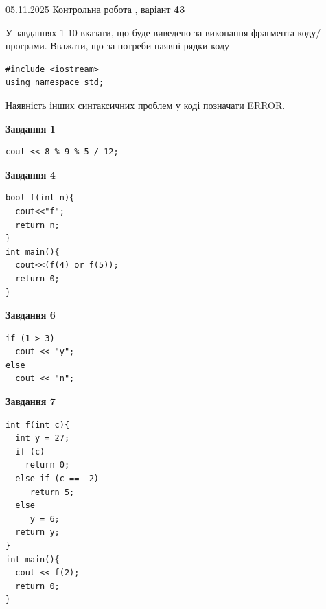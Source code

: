 \documentclass[12pt, ukrainian]{article}
\begin{document}
{\Large{05.11.2025 Контрольна робота , варіант  \No \textbf { 43 }\par}}
{
\begin {large}
У завданнях 1-10 вказати, що буде виведено за виконання фрагмента коду/про\-гра\-ми.
Вважати, що за потреби наявні рядки коду
\begin{verbatim}
#include <iostream>
using namespace std;
\end{verbatim}
Наявність інших синтаксичних проблем у коді позначати ERROR.

\begin{minipage}[t]{7.0cm}

\begin{center}
\textbf{Завдання 1}
\end{center}
\vspace{-8mm}

\begin{verbatim}
cout << 8 % 9 % 5 / 12;
\end{verbatim}



\begin{center}
\textbf{Завдання 4}
\end{center}
\vspace{-8mm}

\begin{verbatim}
bool f(int n){
  cout<<"f";
  return n;
}
int main(){
  cout<<(f(4) or f(5));
  return 0;
}
\end{verbatim}



\begin{center}
\textbf{Завдання 6}
\end{center}
\vspace{-8mm}

\begin{verbatim}
if (1 > 3)
  cout << "y";
else
  cout << "n";
\end{verbatim}



\begin{center}
\textbf{Завдання 7}
\end{center}
\vspace{-8mm}

\begin{verbatim}
int f(int c){
  int y = 27;
  if (c)
    return 0;
  else if (c == -2)
     return 5;
  else
     y = 6;
  return y;
}
int main(){
  cout << f(2);
  return 0;
}
\end{verbatim}


\end{minipage}
\end{large}}
\end{document}
